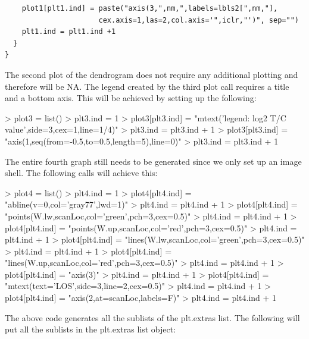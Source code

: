 \documentclass[]{article}
\begin{document}
\begin{verbatim}
    plot1[plt1.ind] = paste("axis(3,",nm,",labels=lbls2[",nm,"],
                      cex.axis=1,las=2,col.axis='",iclr,"')", sep="")
    plt1.ind = plt1.ind +1 
  }     
}
\end{verbatim}

\quad The second plot of the dendrogram does not require any additional plotting and therefore will be NA. The legend created by the third plot call requires a title and a bottom axis. This will be achieved by setting up the following:

\begin{Schunk}
\begin{Sinput}
> plot3 = list()
> plt3.ind = 1
> plot3[plt3.ind] = "mtext('legend: log2 T/C value',side=3,cex=1,line=1/4)"
> plt3.ind = plt3.ind + 1
> plot3[plt3.ind] = "axis(1,seq(from=-0.5,to=0.5,length=5),line=0)"
> plt3.ind = plt3.ind + 1
\end{Sinput}
\end{Schunk}
\quad The entire fourth graph still needs to be generated since we only set up an image shell. The following calls will achieve this:

\begin{Schunk}
\begin{Sinput}
> plot4 = list()
> plt4.ind = 1
> plot4[plt4.ind] = "abline(v=0,col='gray77',lwd=1)"
> plt4.ind = plt4.ind + 1
> plot4[plt4.ind] = "points(W.lw,scanLoc,col='green',pch=3,cex=0.5)"
> plt4.ind = plt4.ind + 1
> plot4[plt4.ind] = "points(W.up,scanLoc,col='red',pch=3,cex=0.5)"
> plt4.ind = plt4.ind + 1
> plot4[plt4.ind] = "lines(W.lw,scanLoc,col='green',pch=3,cex=0.5)"
> plt4.ind = plt4.ind + 1
> plot4[plt4.ind] = "lines(W.up,scanLoc,col='red',pch=3,cex=0.5)"
> plt4.ind = plt4.ind + 1
> plot4[plt4.ind] = "axis(3)"
> plt4.ind = plt4.ind + 1
> plot4[plt4.ind] = "mtext(text='LOS',side=3,line=2,cex=0.5)"
> plt4.ind = plt4.ind + 1
> plot4[plt4.ind] = "axis(2,at=scanLoc,labels=F)"
> plt4.ind = plt4.ind + 1
\end{Sinput}
\end{Schunk}
\quad The above code generates all the sublists of the plt.extras list. The following will put all the sublists in the plt.extras list object:
\end{document}

